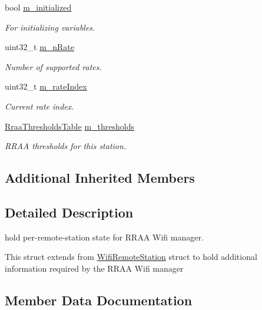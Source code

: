 \begin{DoxyCompactItemize}
bool \hyperlink{structns3_1_1RraaWifiRemoteStation_a4fb5807b3401f2c5c98bae6ffd383d81}{m\+\_\+initialized}
\begin{DoxyCompactList}\small\item\em For initializing variables. \end{DoxyCompactList}\item 
uint32\+\_\+t \hyperlink{structns3_1_1RraaWifiRemoteStation_a82c7acaaa5cebb9db116f3f31ec40c11}{m\+\_\+n\+Rate}
\begin{DoxyCompactList}\small\item\em Number of supported rates. \end{DoxyCompactList}\item 
uint32\+\_\+t \hyperlink{structns3_1_1RraaWifiRemoteStation_a709a97082ff9ac530759259f6c33233b}{m\+\_\+rate\+Index}
\begin{DoxyCompactList}\small\item\em Current rate index. \end{DoxyCompactList}\item 
\hyperlink{namespacens3_a726225cd2329a9841319922125c6344b}{Rraa\+Thresholds\+Table} \hyperlink{structns3_1_1RraaWifiRemoteStation_a4842142c3da4fce162def309b6cb8829}{m\+\_\+thresholds}
\begin{DoxyCompactList}\small\item\em R\+R\+AA thresholds for this station. \end{DoxyCompactList}\end{DoxyCompactItemize}
\subsection*{Additional Inherited Members}


\subsection{Detailed Description}
hold per-\/remote-\/station state for R\+R\+AA Wifi manager. 

This struct extends from \hyperlink{structns3_1_1WifiRemoteStation}{Wifi\+Remote\+Station} struct to hold additional information required by the R\+R\+AA Wifi manager 

\subsection{Member Data Documentation}
